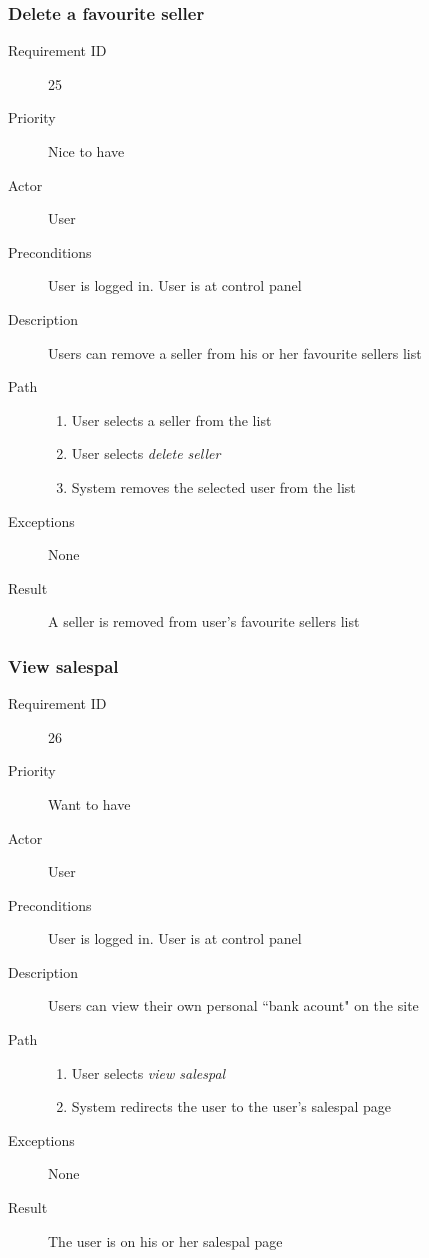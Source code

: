 		\subsubsection{Delete a favourite seller}
			\begin{description}
				\item[Requirement ID] 25
				\item[Priority] Nice to have
				\item[Actor] User
				\item[Preconditions] User is logged in. User is at control panel
				\item[Description] Users can remove a seller from his or her favourite sellers list
				\item[Path]
 					\begin{enumerate}
						\item User selects a seller from the list
						\item User selects \emph{delete seller} 
						\item System removes the selected user from the list
					\end{enumerate}
				\item[Exceptions] None
				\item[Result] A seller is removed from user's favourite sellers list
			\end{description}
		\subsubsection{View salespal}
			\begin{description}
				\item[Requirement ID] 26
				\item[Priority] Want to have
				\item[Actor] User
				\item[Preconditions] User is logged in. User is at control panel
				\item[Description] Users can view their own personal ``bank acount" on the site
				\item[Path]
 					\begin{enumerate}
						\item User selects \emph{view salespal}
						\item System redirects the user to the user's salespal page
					\end{enumerate}
				\item[Exceptions] None
				\item[Result] The user is on his or her salespal page
			\end{description}
